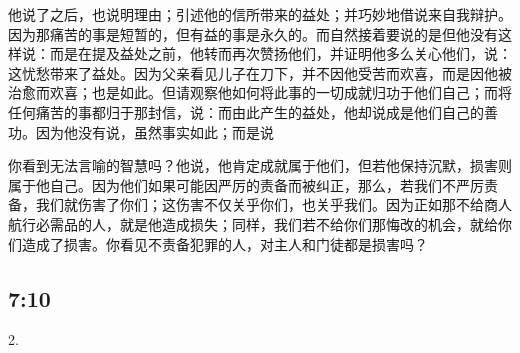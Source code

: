 \par

他说了之后，也说明理由；引述他的信所带来的益处；并巧妙地借说来自我辩护。因为那痛苦的事是短暂的，但有益的事是永久的。而自然接着要说的是但他没有这样说：而是在提及益处之前，他转而再次赞扬他们，并证明他多么关心他们，说：这忧愁带来了益处。因为父亲看见儿子在刀下，并不因他受苦而欢喜，而是因他被治愈而欢喜；也是如此。但请观察他如何将此事的一切成就归功于他们自己；而将任何痛苦的事都归于那封信，说：而由此产生的益处，他却说成是他们自己的善功。因为他没有说，虽然事实如此；而是说\par

\par

你看到无法言喻的智慧吗？他说，他肯定成就属于他们，但若他保持沉默，损害则属于他自己。因为他们如果可能因严厉的责备而被纠正，那么，若我们不严厉责备，我们就伤害了你们；这伤害不仅关乎你们，也关乎我们。因为正如那不给商人航行必需品的人，就是他造成损失；同样，我们若不给你们那悔改的机会，就给你们造成了损害。你看见不责备犯罪的人，对主人和门徒都是损害吗？\par


\subsection{ 7:10}

2. \par

